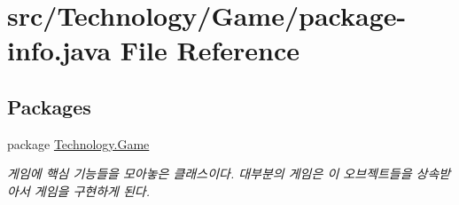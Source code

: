 \hypertarget{_technology_2_game_2package-info_8java}{\section{src/\-Technology/\-Game/package-\/info.java File Reference}
\label{_technology_2_game_2package-info_8java}
}
\subsection*{Packages}
\begin{DoxyCompactItemize}
\item 
package \hyperlink{namespace_technology_1_1_game}{Technology.\-Game}
\begin{DoxyCompactList}\small\item\em 게임에 핵심 기능들을 모아놓은 클래스이다. 대부분의 게임은 이 오브젝트들을 상속받아서 게임을 구현하게 된다. \end{DoxyCompactList}\end{DoxyCompactItemize}
